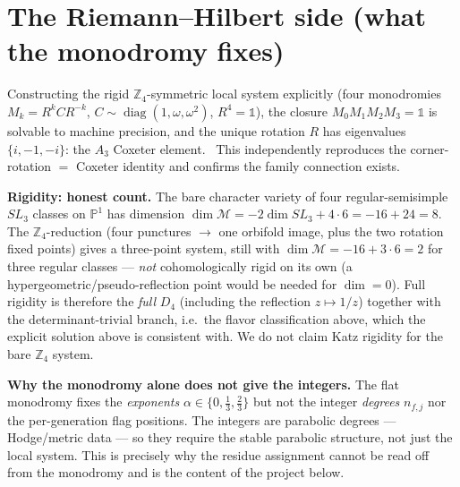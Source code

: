\section{The Riemann--Hilbert side (what the monodromy fixes)}
Constructing the rigid $\mathbb Z_4$-symmetric local system explicitly (four monodromies
$M_k=R^kCR^{-k}$, $C\sim\operatorname{diag}(1,\omega,\omega^2)$, $R^4=\mathbb 1$), the closure
$M_0M_1M_2M_3=\mathbb 1$ is solvable to machine precision, and the unique rotation $R$ has eigenvalues
$\{i,-1,-i\}$: the $A_3$ Coxeter element. \mE\ This independently reproduces the corner-rotation
$=$ Coxeter identity and confirms the family connection exists.

\par\smallskip\noindent\textbf{Rigidity: honest count.}
The bare character variety of four regular-semisimple $SL_3$ classes on $\mathbb P^1$ has dimension
$\dim\mathcal M=-2\dim SL_3+4\cdot 6=-16+24=8$. The $\mathbb Z_4$-reduction (four punctures $\to$ one
orbifold image, plus the two rotation fixed points) gives a three-point system, still with
$\dim\mathcal M=-16+3\cdot 6=2$ for three regular classes --- \emph{not} cohomologically rigid on its
own (a hypergeometric/pseudo-reflection point would be needed for $\dim=0$). Full rigidity is therefore
the \emph{full} $D_4$ (including the reflection $z\mapsto 1/z$) together with the determinant-trivial
branch, i.e.\ the flavor classification above, which the explicit solution above is consistent with. We do not
claim Katz rigidity for the bare $\mathbb Z_4$ system.
\par\smallskip

\par\smallskip\noindent\textbf{Why the monodromy alone does not give the integers.}
The flat monodromy fixes the \emph{exponents} $\alpha\in\{0,\tfrac13,\tfrac23\}$ but not the integer
\emph{degrees} $n_{f,j}$ nor the per-generation flag positions. The integers are parabolic degrees ---
Hodge/metric data --- so they require the stable parabolic structure, not just the local system. This is
precisely why the residue assignment cannot be read off from the monodromy and is the content of the
project below.
\par\smallskip

